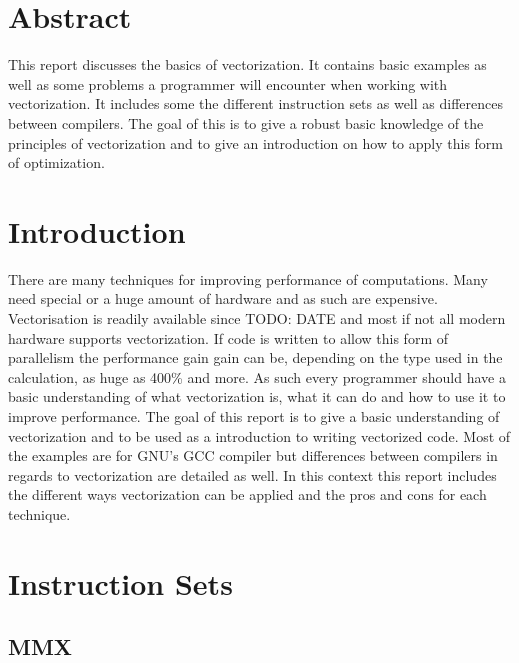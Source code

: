 \documentclass[
	12pt,
	a4paper,
	BCOR10mm,
	DIV14,
	headsepline,
	usegeometry,
]{scrreprt}
\begin{document}
\restoregeometry

\chapter*{Abstract}

\thispagestyle{empty}

This report discusses the basics of vectorization. It contains basic examples as well as some problems a programmer will encounter when working with
vectorization. It includes some the different instruction sets as well as differences between
compilers. The goal of this is to give a robust basic knowledge of the principles of
vectorization and to give an introduction on how to apply this form of optimization.
\tableofcontents

\chapter{Introduction}
There are many techniques for improving performance of computations. Many need special or a huge
amount of hardware and as such are expensive. Vectorisation is readily available since TODO: DATE
and most if not all modern hardware supports vectorization. If code is written to allow this form
of parallelism the performance gain gain can be, depending on the type used in the calculation, as
huge as 400\% and more. As such every programmer should have a
basic understanding of what vectorization is, what it can do and how to use it to
improve performance. The goal of this report is to give a basic understanding of vectorization and
to be used as a introduction to writing vectorized code. Most of the examples are for GNU's GCC
compiler but differences between compilers in regards to vectorization are detailed as well.
In this context this report includes the different ways vectorization can be applied and the pros
and cons for each technique.

\chapter{Instruction Sets}
    \section{MMX}
\end{document}
